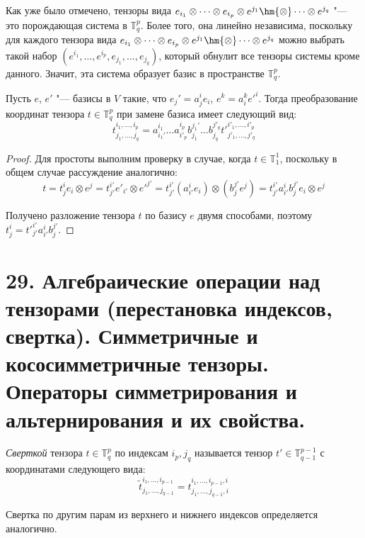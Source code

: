 \begin{note}
    Как уже было отмечено, тензоры вида $e_{i_1} \otimes \dots \otimes e_{i_p} \otimes e^{j_1} \hm{\otimes} \dots \otimes e^{j_q}$ "--- это порождающая система в $\mathbb T^p_q$. Более того, она линейно независима, поскольку для каждого тензора вида $e_{i_1} \otimes \dots \otimes e_{i_p} \otimes e^{j_1} \hm{\otimes} \dots \otimes e^{j_q}$ можно выбрать такой набор $(e^{i_1}, \dots, e^{i_p}, e_{j_1}, \dots, e_{j_q})$, который обнулит все тензоры системы кроме данного. Значит, эта система образует базис в пространстве $\mathbb{T}^p_q$.
\end{note}

\begin{theorem}
    Пусть $e$, $e'$ "--- базисы в $V$ такие, что $e_j' = a_j^ie_i$, $e^k = a^k_ie'^i$. Тогда преобразование координат тензора $t \in \mathbb T^p_q$ при замене базиса имеет следующий вид:
    \[t^{i_1, \dots, i_p}_{j_1, \dots, j_q} = a^{i_1}_{i_1'}\dots a^{i_p}_{i'_p}b^{j_1'}_{j_1}\dots b^{j'_q}_{j_q}t'^{i'_1, \dots, i'_p}_{j'_1, \dots, j'_q}\]
\end{theorem}

\begin{proof}
    Для простоты выполним проверку в случае, когда $t \in \mathbb{T}^1_1$, поскольку в общем случае рассуждение аналогично:
    \[t = t^i_je_i \otimes e^j = t^{i'}_{j'}e'_{i'} \otimes e'^{j'} = t^{i'}_{j'}(a_{i'}^ie_i) \otimes (b^{j'}_je^{j}) = t^{i'}_{j'}a^i_{i'}b^{j'}_j e_i \otimes e^j\]
    
    Получено разложение тензора $t$ по базису $e$ двумя способами, поэтому $t^i_j = t'^{i'}_{j'}a^i_{i'}b^{j'}_j$.
\end{proof}

\section{29. Алгебраические операции над тензорами (перестановка индексов, свертка). Симметричные и кососимметричные тензоры. Операторы симметрирования и альтернирования и их свойства.}

\begin{definition}
    \textit{Сверткой} тензора $t \in \mathbb{T}^p_q$ по индексам $i_p, j_q$ называется тензор $t' \in \mathbb T^{p-1}_{q-1}$ с координатами следующего вида:
    \[\widetilde t^{i_1, \dots, i_{p-1}}_{j_1, \dots, j_{q-1}} = t^{i_1, \dots, i_{p - 1}, i}_{j_1, \dots, j_{q-1}, i}\]
    
    Свертка по другим парам из верхнего и нижнего индексов определяется аналогично.
\end{definition}

